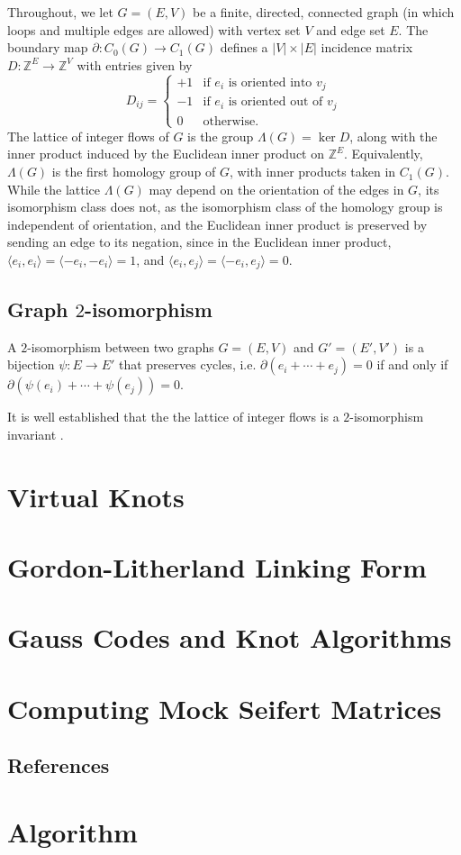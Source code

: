 \documentclass[12pt]{report}
\newcommand{\Z}{\mathbb{Z}}
\newcommand{\ip}[2]{\langle #1, #2 \rangle}
\begin{document}
Throughout, we let $G = (E, V)$ be a finite, directed, connected graph (in which loops and multiple edges are allowed) with vertex set $V$ and edge set $E$. The boundary map $\partial:  C_{0}(G) \longrightarrow C_{1}(G)$ defines a $|V|\times|E|$ incidence matrix $D : \Z^{E} \longrightarrow \Z^{V}$ with entries given by
\[D_{ij} = \begin{cases}
	+1 & \text{if $e_{i}$ is oriented into $v_{j}$}   \\
	-1 & \text{if $e_{i}$ is oriented out of $v_{j}$} \\
	0  & \text{otherwise.}
\end{cases}\]
The lattice of integer flows of $G$ is the group $\Lambda(G) = \ker D$, along with the inner product induced by the Euclidean inner product on $\Z^{E}$. Equivalently, $\Lambda(G)$ is the first homology group of $G$, with inner products taken in $C_{1}(G)$. While the lattice $\Lambda(G)$ may depend on the orientation of the edges in $G$, its isomorphism class does not, as the isomorphism class of the homology group is independent of orientation, and the Euclidean inner product is preserved by sending an edge to its negation, since in the Euclidean inner product, $\ip{e_{i}}{e_{i}} =  \ip{-e_{i}}{-e_{i}} = 1$, and $\ip{e_{i}}{e_{j}} = \ip{-e_{i}}{e_{j}} = 0$.

\section{Graph $2$-isomorphism}

A $2$-isomorphism between two graphs $G = (E, V)$ and $G' = (E', V')$ is a bijection \({\psi: E \longrightarrow E'}\) that preserves cycles, i.e. $\partial(e_{i} + \cdots + e_{j}) = 0$ if and only if $\partial\left(\psi(e_{i}) + \cdots + \psi(e_{j})\right) = 0$.

It is well established that the the lattice of integer flows is a $2$-isomorphism invariant \parencite{lattice-of-flows-cuts}.

\chapter{Virtual Knots}

\chapter{Gordon-Litherland Linking Form}

\chapter{Gauss Codes and Knot Algorithms}


\chapter{Computing Mock Seifert Matrices}

\newpage
\section*{References}
\printbibliography


\appendix

\chapter{Algorithm}
\end{document}
